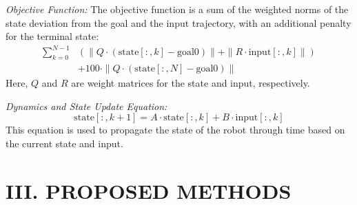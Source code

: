 \documentclass[
	letterpaper, %
	10pt, %
	unnumberedsections, %
	twoside, %
]{LTJournalArticle}
\begin{document}
\noindent \textit{Objective Function:} The objective function is a sum of the weighted norms of the state deviation from the goal and the input trajectory, with an additional penalty for the terminal state:
\begin{align}
\sum_{k=0}^{N-1} &\left( \| Q \cdot (\text{state}[:, k] - \text{goal0}) \| \right. \left. + \| R \cdot \text{input}[:, k] \| \right) \nonumber \\
& + 100 \cdot \| Q \cdot (\text{state}[:, N] - \text{goal0}) \| \nonumber
\end{align}
Here, \( Q \) and \( R \) are weight matrices for the state and input, respectively.

\noindent \textit{Dynamics and State Update Equation:}
\[
\text{state}[:, k + 1] = A \cdot \text{state}[:, k] + B \cdot \text{input}[:, k]
\]
This equation is used to propagate the state of the robot through time based on the current state and input.

\section{III. PROPOSED METHODS}



\end{document}
